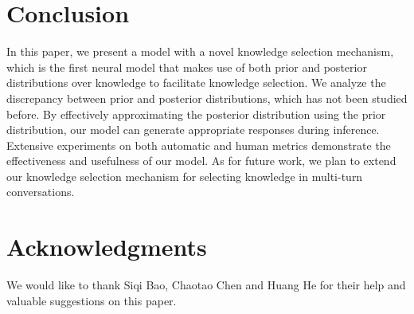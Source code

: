 \documentclass{article}
\begin{document}
\section{Conclusion}
In this paper, we present a model with a novel knowledge selection mechanism,
which is the first neural model that makes use of both prior and posterior distributions over knowledge to facilitate knowledge selection.
We analyze the discrepancy between prior and posterior distributions,
which has not been studied before.
By effectively approximating the posterior distribution using the prior distribution,
our model can generate appropriate responses during inference.
Extensive experiments on both automatic and human metrics demonstrate the effectiveness and usefulness of our model.
As for future work,
we plan to extend our knowledge selection mechanism for selecting knowledge in multi-turn conversations.

\section*{Acknowledgments}
We would like to thank Siqi Bao, Chaotao Chen and Huang He
for their help and valuable suggestions on this paper.


%
%


\end{document}
